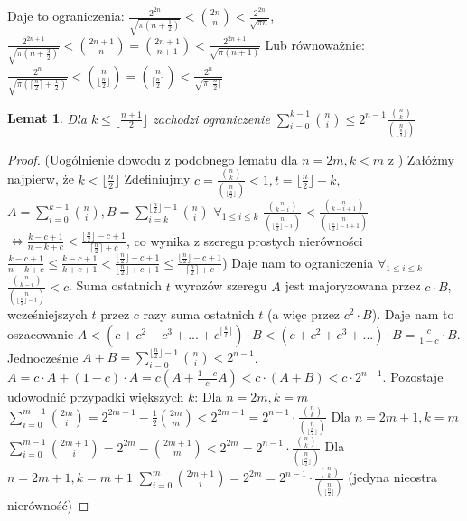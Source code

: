 \documentclass{pracamgr}
\newtheorem{lemma}[theorem]{Lemat}
\begin{document}
   Daje to ograniczenia:
   $\frac{2^{2n}}{\sqrt{\pi(n+\frac{1}{2})}}<{2n\choose n}<\frac{2^{2n}}{\sqrt{\pi n}}$,\quad\quad
   $\frac{2^{2n+1}}{\sqrt{\pi(n+\frac{3}{2})}}<{2n+1\choose n}={2n+1\choose n+1}<\frac{2^{2n+1}}{\sqrt{\pi(n+1)}}$\newline
   Lub równoważnie:
   $\frac{2^n}{\sqrt{\pi(\lceil\frac{n}{2}\rceil+\frac{1}{2})}}<{n\choose\lfloor\frac{n}{2}\rfloor}
   ={n\choose\lceil\frac{n}{2}\rceil}<\frac{2^n}{\sqrt{\pi\lceil\frac{n}{2}\rceil}}$
   \begin{lemma}\label{binomial sum upper bound}
    Dla $k\le\lfloor\frac{n+1}{2}\rfloor$ zachodzi ograniczenie $\sum_{i=0}^{k-1}{n\choose i}\le2^{n-1}\frac{{n\choose k}}{{n\choose \lfloor\frac{n}{2}\rfloor}}$
   \end{lemma}
   \begin{proof}
    (Uogólnienie dowodu z podobnego lematu dla $n=2m,k<m$ z \cite{LPV})\newline%
    Załóżmy najpierw, że $k<\lfloor\frac{n}{2}\rfloor$\newline
    Zdefiniujmy $c=\frac{{n\choose k}}{{n\choose \lfloor\frac{n}{2}\rfloor}}<1,t=\lfloor\frac{n}{2}\rfloor-k,$
    $A=\sum_{i=0}^{k-1}{n\choose i}, B=\sum_{i=k}^{\lfloor\frac{n}{2}\rfloor-1}{n\choose i}$\newline
    $\forall_{1\le i\le k}$ $\frac{{n\choose k-i}}{{n\choose \lfloor\frac{n}{2}\rfloor-i}}<\frac{{n\choose k-i+1}}{{n\choose \lfloor\frac{n}{2}\rfloor-i+1}}$
    $\Leftrightarrow \frac{k-c+1}{n-k+c}<\frac{\lfloor\frac{n}{2}\rfloor-c+1}{\lceil\frac{n}{2}\rceil+c}$,\newline
    co wynika z szeregu prostych nierówności $\frac{k-c+1}{n-k+c}\le\frac{k-c+1}{k+c+1}
    <\frac{\lfloor\frac{n}{2}\rfloor-c+1}{\lfloor\frac{n}{2}\rfloor+c+1}\le\frac{\lfloor\frac{n}{2}\rfloor-c+1}{\lceil\frac{n}{2}\rceil+c}$)\newline
    Daje nam to ograniczenia $\forall_{1\le i\le k}$ $\frac{{n\choose k-i}}{{n\choose \lfloor\frac{n}{2}\rfloor-i}}<c$.\newline
    Suma ostatnich $t$ wyrazów szeregu $A$ jest majoryzowana przez $c\cdot B$, wcześniejszych $t$ przez $c$ razy suma ostatnich $t$ (a więc przez $c^2\cdot B$).
    Daje nam to oszacowanie $A<(c+c^2+c^3+...+c^{\lfloor\frac{k}{t}\rfloor})\cdot B<(c+c^2+c^3+...)\cdot B=\frac{c}{1-c}\cdot B$.
    Jednocześnie $A+B=\sum_{i=0}^{\lfloor\frac{n}{2}\rfloor-1}{n\choose i}<2^{n-1}$.
    $A=c\cdot A+(1-c)\cdot A=c(A+\frac{1-c}{c}A)<c\cdot(A+B)<c\cdot 2^{n-1}$.\newline
    Pozostaje udowodnić przypadki większych $k$:\newline
    Dla $n=2m,k=m$ $\sum_{i=0}^{m-1}{2m\choose i}=2^{2m-1}-\frac{1}{2}{2m\choose m}<2^{2m-1}=
    2^{n-1}\cdot\frac{{n\choose k}}{{n\choose \lfloor\frac{n}{2}\rfloor}}$\newline
    Dla $n=2m+1,k=m$ $\sum_{i=0}^{m-1}{2m+1\choose i}=2^{2m}-{2m+1\choose m}<2^{2m}=
    2^{n-1}\cdot\frac{{n\choose k}}{{n\choose \lfloor\frac{n}{2}\rfloor}}$\newline
    Dla $n=2m+1,k=m+1$ $\sum_{i=0}^{m}{2m+1\choose i}=2^{2m}=
    2^{n-1}\cdot\frac{{n\choose k}}{{n\choose \lfloor\frac{n}{2}\rfloor}}$ (jedyna nieostra nierówność)\newline
   \end{proof}
\end{document}
